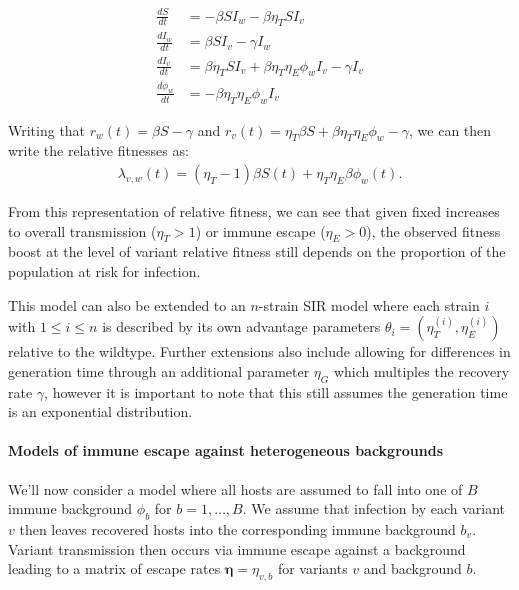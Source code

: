 \documentclass[12pt,oneside,letterpaper]{article}
\renewcommand{\vec}[1]{\boldsymbol{#1}}
\begin{document}
\begin{align*}
    \frac{d S}{d t} &= - \beta S I_{w} - \beta \eta_{T} S I_{v}\\ 
    \frac{d I_{w}}{dt} &= \beta S I_{v} - \gamma I_{w}\\
    \frac{d I_{v}}{dt} &= \beta \eta_{T} S I_{v} + \beta \eta_{T} \eta_{E} \phi_{w} I_{v} - \gamma I_{v}\\
    \frac{d \phi_{w}}{dt} &= - \beta \eta_{T} \eta_{E} \phi_{w} I_{v}
\end{align*}

Writing that $r_{w}(t) = \beta S - \gamma$ and $r_{v}(t) = \eta_{T} \beta  S + \beta \eta_{T} \eta_{E} \phi_{w} - \gamma$, we can then write the relative fitnesses as:
\begin{align*}
\lambda_{v,w}(t) = (\eta_{T} - 1)\beta S(t) + \eta_{T} \eta_{E} \beta \phi_{w}(t).
\end{align*}

From this representation of relative fitness, we can see that given fixed increases to overall transmission ($\eta_{T} > 1$) or immune escape ($\eta_{E} > 0$), the observed fitness boost at the level of variant relative fitness still depends on the proportion of the population at risk for infection.

This model can also be extended to an $n$-strain SIR model where each strain $i$ with $1\leq i \leq n$ is described by its own advantage parameters $\theta_{i} = (\eta_{T}^{(i)},\eta_{E}^{(i)})$  relative to the wildtype.
Further extensions also include allowing for differences in generation time through an additional parameter $\eta_{G}$ which multiples the recovery rate $\gamma$, however it is important to note that this still assumes the generation time is an exponential distribution.


\paragraph{Models of immune escape against heterogeneous backgrounds}%

We'll now consider a model where all hosts are assumed to fall into one of $B$ immune background $\phi_{b}$ for $b =1, \ldots, B$.
We assume that infection by each variant $v$ then leaves recovered hosts into the corresponding immune background $b_{v}$.
Variant transmission then occurs via immune escape against a background leading to a matrix of escape rates $\vec{\eta} = \eta_{v,b}$ for variants $v$ and background $b$.
\end{document}
